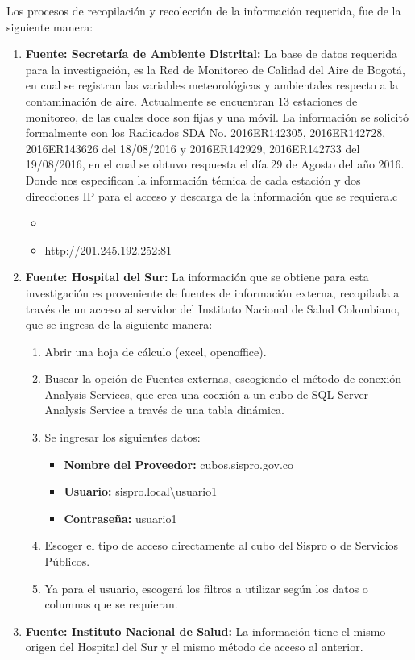 \documentclass[a4paper,openright,12pt]{book}
\theoremstyle{definition}
\theoremstyle{remark}
\begin{document}
Los procesos de recopilación y recolección de la información requerida, fue de la siguiente manera:
\begin{enumerate}
	\item \textbf{Fuente: Secretaría de Ambiente Distrital:} La base de datos requerida para la investigación, es la Red de Monitoreo de Calidad del Aire de Bogotá, en cual se registran las variables meteorológicas y ambientales respecto a la contaminación de aire. Actualmente se encuentran 13 estaciones de monitoreo, de las cuales doce son fijas y una móvil. La información se solicitó formalmente con los Radicados SDA No. 2016ER142305, 2016ER142728, 2016ER143626 del 18/08/2016 y 2016ER142929, 2016ER142733 del 19/08/2016, en el cual se obtuvo respuesta el día 29 de Agosto del año 2016. Donde nos especifican la información técnica de cada estación y dos direcciones IP para el acceso y descarga de la información que se requiera.c
    \begin{itemize}
		\item %
        \item http://201.245.192.252:81
	\end{itemize}
    \item \textbf{Fuente: Hospital del Sur:} La información  que se  obtiene para esta investigación es proveniente de fuentes de información externa, recopilada a través de un acceso al servidor del Instituto Nacional de Salud Colombiano, que se ingresa de la siguiente manera:
    \begin{enumerate}
		\item Abrir una hoja de cálculo (excel, openoffice).
        \item Buscar la opción de Fuentes externas, escogiendo el método de conexión Analysis Services, que crea una coexión a un cubo de SQL Server Analysis Service a través de una tabla dinámica.
        \item Se ingresar los siguientes datos:
            \begin{itemize}
				\item \textbf{Nombre del Proveedor:} cubos.sispro.gov.co
       			 \item \textbf{Usuario:} sispro.local\textbackslash usuario1
				\item \textbf{Contraseña:} usuario1
	\end{itemize}
    	\item Escoger el tipo de acceso directamente al cubo del Sispro o de Servicios Públicos.
        \item Ya para el usuario, escogerá los filtros a utilizar según los datos o columnas que se requieran.
	\end{enumerate}
    

    \item \textbf{Fuente: Instituto Nacional de Salud:} La información tiene el mismo origen del Hospital del Sur y el mismo método de acceso al anterior.
\end{enumerate}
\end{document}
